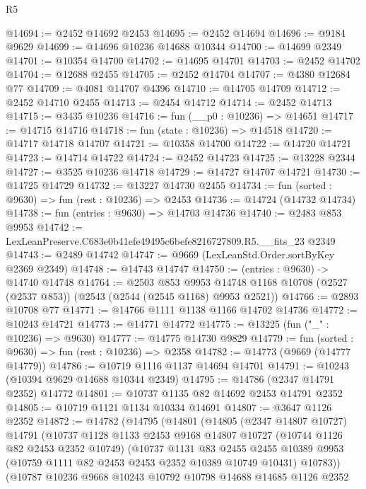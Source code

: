 \begin{lexlean}{R5}
\begin{coremodule}
@14694 := @2452 @14692 @2453
@14695 := @2452 @14694
@14696 := @9184 @9629
@14699 := @14696 @10236 @14688 @10344
@14700 := @14699 @2349
@14701 := @10354 @14700
@14702 := @14695 @14701
@14703 := @2452 @14702
@14704 := @12688 @2455
@14705 := @2452 @14704
@14707 := @4380 @12684 @77
@14709 := @4081 @14707 @4396
@14710 := @14705 @14709
@14712 := @2452 @14710 @2455
@14713 := @2454 @14712
@14714 := @2452 @14713
@14715 := @3435 @10236
@14716 := fun (__p0 : @10236) => @14651
@14717 := @14715 @14716
@14718 := fun (state : @10236) => @14518
@14720 := @14717 @14718 @14707
@14721 := @10358 @14700
@14722 := @14720 @14721
@14723 := @14714 @14722
@14724 := @2452 @14723
@14725 := @13228 @2344
@14727 := @3525 @10236 @14718
@14729 := @14727 @14707 @14721
@14730 := @14725 @14729
@14732 := @13227 @14730 @2455
@14734 := fun (sorted : @9630) => fun (rest : @10236) => @2453
@14736 := @14724 (@14732 @14734)
@14738 := fun (entries : @9630) => @14703 @14736
@14740 := @2483 @853 @9953
@14742 := LexLeanPreserve.C683e0b41efe49495c6befe8216727809.R5.__fits_23 @2349
@14743 := @2489 @14742
@14747 := @9669 (LexLeanStd.Order.sortByKey @2369 @2349)
@14748 := @14743 @14747
@14750 := (entries : @9630) -> @14740 @14748
@14764 := @2503
    @853
    @9953
    @14748
    @1168
    @10708
    (@2527 (@2537 @853))
    (@2543 (@2544 (@2545 @1168) @9953 @2521))
@14766 := @2893 @10708 @77
@14771 := @14766 @1111 @1138 @1166 @14702 @14736
@14772 := @10243 @14721
@14773 := @14771 @14772
@14775 := @13225 (fun ("_" : @10236) => @9630)
@14777 := @14775 @14730 @9829
@14779 := fun (sorted : @9630) => fun (rest : @10236) => @2358
@14782 := @14773 (@9669 (@14777 @14779))
@14786 := @10719 @1116 @1137 @14694 @14701
@14791 := @10243 (@10394 @9629 @14688 @10344 @2349)
@14795 := @14786 (@2347 @14791 @2352) @14772
@14801 := @10737 @1135 @82 @14692 @2453 @14791 @2352
@14805 := @10719 @1121 @1134 @10334 @14691
@14807 := @3647 @1126 @2352
@14872 := @14782
    (@14795
      (@14801
        (@14805
          (@2347 @14807 @10727)
          @14791
          (@10737
            @1128
            @1133
            @2453
            @9168
            @14807
            @10727
            (@10744 @1126 @82 @2453 @2352 @10749)
            (@10737
              @1131
              @83
              @2455
              @2455
              @10389
              @9953
              (@10759 @1111 @82 @2453 @2453 @2352 @10389 @10749 @10431)
              @10783))
          (@10787
            @10236
            @9668
            @10243
            @10792
            @10798
            @14688
            @14685
            @1126
            @2352

\end{coremodule}
\end{lexlean}
